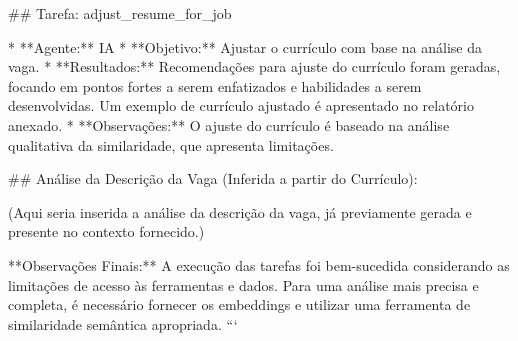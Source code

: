 ## Tarefa: adjust_resume_for_job

* **Agente:** IA
* **Objetivo:** Ajustar o currículo com base na análise da vaga.
* **Resultados:** Recomendações para ajuste do currículo foram geradas, focando em pontos fortes a serem enfatizados e habilidades a serem desenvolvidas. Um exemplo de currículo ajustado é apresentado no relatório anexado.
* **Observações:**  O ajuste do currículo é baseado na análise qualitativa da similaridade, que apresenta limitações.

## Análise da Descrição da Vaga (Inferida a partir do Currículo):

(Aqui seria inserida a análise da descrição da vaga, já previamente gerada e presente no contexto fornecido.)

**Observações Finais:**  A execução das tarefas foi bem-sucedida considerando as limitações de acesso às ferramentas e dados.  Para uma análise mais precisa e completa, é necessário fornecer os embeddings e utilizar uma ferramenta de similaridade semântica apropriada.
```